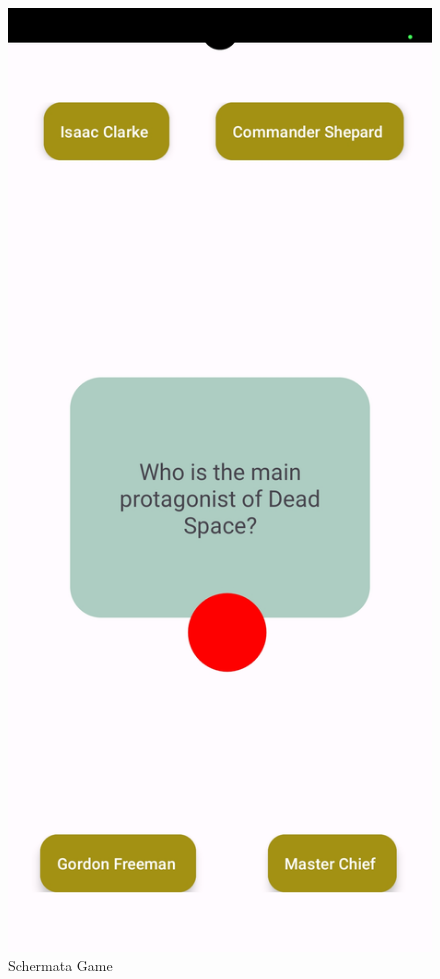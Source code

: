 \begin{figure}[htbp]
    \centering
    \includegraphics[scale=0.14]{ProgettoAndroid/Game/Images/CameraApp_Screen_quiz.jpg}
    \caption{Schermata Game}
    \label{fig:game}
\end{figure}